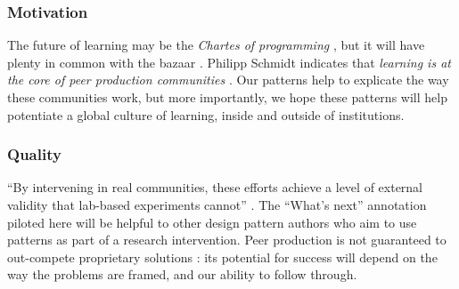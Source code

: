 \vspace{-.25\baselineskip}

\subsubsection*{Motivation}  The future of learning may be
the \emph{Chartes of programming} \cite{alexander1999origins}, but it will have plenty in common with the
bazaar \cite{raymond2001cathedral}.
%
Philipp Schmidt indicates that \emph{learning is at the core of peer
  production communities} \cite{schmidt+commons-based+2009}.  Our
patterns help to explicate the way these communities work, but more
importantly, we hope these patterns will help potentiate a global
culture of learning, inside and outside of institutions.

\vspace{-.25\baselineskip}

\subsubsection*{Quality} 
``By intervening in real communities, these efforts achieve a level of
external validity that lab-based experiments cannot''
\cite{benkler2015peer}.  The ``What's next'' annotation piloted here
will be helpful to other design pattern authors who aim to use
patterns as part of a research intervention.  Peer production is not guaranteed to
  out-compete proprietary solutions
\cite{benkler2015peer,free-software-better}: its potential for
success will depend on the way the problems are framed,
and our ability to follow through.





